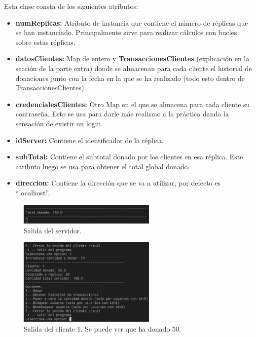 \documentclass{article}
\begin{document}
Esta clase consta de los siguientes atributos:
\begin{itemize}
    \item \textbf{numReplicas: }Atributo de instancia que contiene el número de réplicas que se han instanciado. Principalmente sirve para realizar cálculos con bucles sobre estas réplicas.
    
    \item \textbf{datosClientes: }Map de entero y \textbf{TransaccionesClientes} (explicación en la sección de la parte extra) donde se almacenan para cada cliente el historial de donaciones junto con la fecha en la que se ha realizado (todo esto dentro de TransaccionesClientes).
    \item \textbf{credencialesClientes: }Otro Map en el que se almacena para cada cliente su contraseña. Esto se usa para darle más realismo a la práctica dando la sensación de existir un login.
    \item \textbf{idServer: }Contiene el identificador de la réplica.
    \item \textbf{subTotal: }Contiene el subtotal donado por los clientes en esa réplica. Este atributo luego se usa para obtener el total global donado. 
    \item \textbf{direccion: }Contiene la dirección que se va a utilizar, por defecto es ``localhost''.
\end{itemize}

\begin{figure}[H]
    \centering
    \includegraphics[width=0.6\textwidth]{imagenes/donObligatorioServer.png}
    \caption{Salida del servidor.}
\end{figure}

\begin{figure}[H]
    \centering
    \includegraphics[width=0.6\textwidth]{imagenes/donObligatorioC1.png}
    \caption{Salida del cliente 1. Se puede ver que ha donado 50.}
\end{figure}
\end{document}
